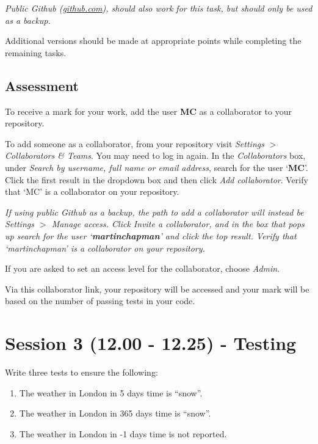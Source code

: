 \documentclass{article}
\begin{document}
\textit{Public Github (\href{https://github.com}{github.com}), should also work for this task,
but should only be used as a backup.}

Additional versions should be made at appropriate points while completing the remaining tasks.

\subsection{Assessment}

To receive a mark for your work,
add the user \textbf{MC} as a collaborator to your repository.

To add someone as a collaborator, from your repository 
visit \textit{Settings} $>$ \textit{Collaborators \& Teams}. You may
need to log in again. In the \textit{Collaborators} box, under
\textit{Search by username, full name or email address}, search for the
user `\textbf{MC}'. Click the first result in the dropdown box and then
click \textit{Add collaborator}. Verify that `MC' is a collaborator on
your repository.

\textit{If using public Github as a backup, the path to add a collaborator will instead be \textit{Settings} $>$
\textit{Manage access}. Click \textit{Invite a collaborator}, and 
in the box that pops up search for the user `\textbf{martinchapman}' and click the top result. Verify that `martinchapman' is a collaborator on your repository.}

If you are asked to set an access level for the collaborator, choose \textit{Admin}.

Via this collaborator link, your repository will be accessed and 
your mark will be based on the number of passing tests
in your code.

\section{Session 3 (12.00 - 12.25) - Testing}

Write three tests to ensure the following:

\begin{enumerate}

    \item The weather in London in 5 days time is ``snow''.

    \item The weather in London in 365 days time is ``snow''.

    \item The weather in London in -1 days time is not reported.

\end{enumerate}
\end{document}
